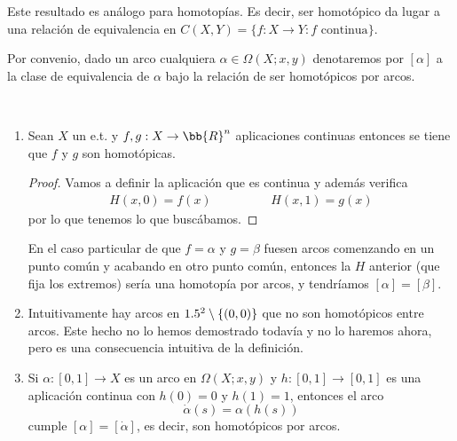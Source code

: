 \begin{observacion}
    Este resultado es análogo para homotopías. Es decir, ser homotópico da lugar a una relación de equivalencia en $C(X,Y) = \{f :X\to Y : f \text{ continua}\}$.
\end{observacion}

\begin{notacion}
    Por convenio, dado un arco cualquiera $\alpha\in \Omega(X;x,y)$ denotaremos por $[\alpha]$ a la clase de equivalencia de $\alpha$ bajo la relación de ser homotópicos por arcos.
\end{notacion}

\begin{ejemplo}\
    \begin{enumerate}
        \item Sean $X$ un e.t. y $f,g:X \to \bb{R}^n$ aplicaciones continuas entonces se tiene que $f$ y $g$ son homotópicas.
        \begin{proof}
            Vamos a definir la aplicación
            que es continua y además verifica
            \begin{gather*}
                H(x,0) = f(x) \hspace{2cm} H(x,1) = g(x)
            \end{gather*}
            por lo que tenemos lo que buscábamos.
        \end{proof}
        En el caso particular de que $f=\alpha$ y $g=\beta$ fuesen arcos comenzando en un punto común y acabando en otro punto común, entonces la $H$ anterior (que fija los extremos) sería una homotopía por arcos, y tendríamos $[\alpha]=[\beta]$.

        \item Intuitivamente hay arcos en $1.5^2\setminus\{(0,0)\}$ que no son homotópicos entre arcos. Este hecho no lo hemos demostrado todavía y no lo haremos ahora, pero es una consecuencia intuitiva de la definición.

        \item Si $\alpha: [0,1]\to X$ es un arco en $\Omega(X;x,y)$ y $h:[0,1] \to [0,1]$ es una aplicación continua con $h(0)=0$ y $h(1)=1$, entonces el arco
        \begin{equation*}
            \dot{\alpha}(s) = \alpha(h(s))
        \end{equation*}
        cumple $[\alpha] = [\dot{\alpha}]$, es decir, son homotópicos por arcos.
        

\end{enumerate}
\end{ejemplo}
